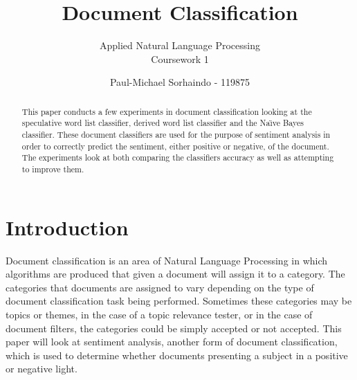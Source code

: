 \documentclass{llncs}
\begin{document}
\title{Document Classification}


\subtitle{Applied Natural Language Processing \\ Coursework 1}

\author{Paul-Michael Sorhaindo - 119875}








\maketitle

\begin{abstract}
This paper conducts a few experiments in document classification looking at the speculative word list classifier, derived word list classifier and the Na\"\i ve Bayes classifier. These document classifiers are used for the purpose of sentiment analysis in order to correctly predict the sentiment, either positive or negative, of the document. The experiments look at both comparing the classifiers accuracy as well as attempting to improve them.
\end{abstract}

\section{Introduction}
Document classification is an area of Natural Language Processing in which algorithms are produced that given a document will assign it to a category. The categories that documents are assigned to vary depending on the type of document classification task being performed. Sometimes these categories may be topics or themes, in the case of a topic relevance tester, or in the case of document filters, the categories could be simply accepted or not accepted. This paper will look at sentiment analysis, another form of document classification, which is used to determine whether documents presenting a subject in a positive or negative light.
\end{document}
